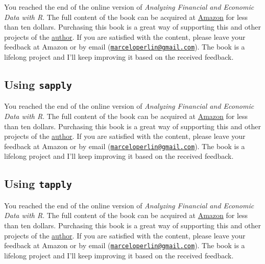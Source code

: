 \documentclass[
  12pt,
]{book}
\newenvironment{pleasebuyit}
{\begin{noteblock}
		
	} {\end{noteblock}}
\begin{document}
\begin{pleasebuyit}
You reached the end of the online version of \emph{Analyzing Financial
and Economic Data with R}. The full content of the book can be acquired
at \href{https://www.amazon.com/dp/B084LSNXMN}{Amazon} for less than ten
dollars. Purchasing this book is a great way of supporting this and
other projects of the \href{https://www.msperlin.com/blog/}{author}. If
you are satisfied with the content, please leave your feedback at Amazon
or by email
(\href{mailto:marceloperlin@gmail.com}{\nolinkurl{marceloperlin@gmail.com}}).
The book is a lifelong project and I'll keep improving it based on the
received feedback.
\end{pleasebuyit}

\hypertarget{using-sapply}{%
\subsection{\texorpdfstring{Using \texttt{sapply}}{Using sapply}}\label{using-sapply}}

\begin{pleasebuyit}
You reached the end of the online version of \emph{Analyzing Financial
and Economic Data with R}. The full content of the book can be acquired
at \href{https://www.amazon.com/dp/B084LSNXMN}{Amazon} for less than ten
dollars. Purchasing this book is a great way of supporting this and
other projects of the \href{https://www.msperlin.com/blog/}{author}. If
you are satisfied with the content, please leave your feedback at Amazon
or by email
(\href{mailto:marceloperlin@gmail.com}{\nolinkurl{marceloperlin@gmail.com}}).
The book is a lifelong project and I'll keep improving it based on the
received feedback.
\end{pleasebuyit}

\hypertarget{using-tapply}{%
\subsection{\texorpdfstring{Using \texttt{tapply}}{Using tapply}}\label{using-tapply}}

\begin{pleasebuyit}
You reached the end of the online version of \emph{Analyzing Financial
and Economic Data with R}. The full content of the book can be acquired
at \href{https://www.amazon.com/dp/B084LSNXMN}{Amazon} for less than ten
dollars. Purchasing this book is a great way of supporting this and
other projects of the \href{https://www.msperlin.com/blog/}{author}. If
you are satisfied with the content, please leave your feedback at Amazon
or by email
(\href{mailto:marceloperlin@gmail.com}{\nolinkurl{marceloperlin@gmail.com}}).
The book is a lifelong project and I'll keep improving it based on the
received feedback.
\end{pleasebuyit}
\end{document}
